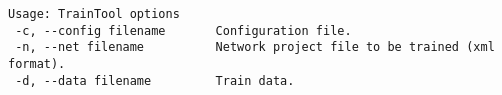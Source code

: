 \begin{verbatim}
Usage: TrainTool options
 -c, --config filename       Configuration file.
 -n, --net filename          Network project file to be trained (xml format).
 -d, --data filename         Train data.
\end{verbatim}
